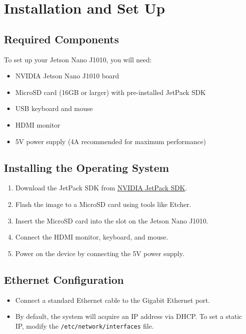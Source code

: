 %
%

\chapter{Installation and Set Up}

\section{Required Components}
To set up your Jetson Nano J1010, you will need:
\begin{itemize}[label=--,left=1.5em]
	\item NVIDIA Jetson Nano J1010 board
	\item MicroSD card (16GB or larger) with pre-installed JetPack SDK
	\item USB keyboard and mouse
	\item HDMI monitor
	\item 5V power supply (4A recommended for maximum performance)
\end{itemize}

\section{Installing the Operating System}
\begin{enumerate}
	\item Download the JetPack SDK from \href{https://developer.nvidia.com/embedded/jetpack}{NVIDIA JetPack SDK}.
	\item Flash the image to a MicroSD card using tools like Etcher.
	\item Insert the MicroSD card into the slot on the Jetson Nano J1010.
	\item Connect the HDMI monitor, keyboard, and mouse.
	\item Power on the device by connecting the 5V power supply.
\end{enumerate}

\section{Ethernet Configuration}
\begin{itemize}[label=--,left=1.5em]
	\item Connect a standard Ethernet cable to the Gigabit Ethernet port.
	\item By default, the system will acquire an IP address via DHCP. To set a static IP, modify the \texttt{/etc/network/interfaces} file.
\end{itemize}


